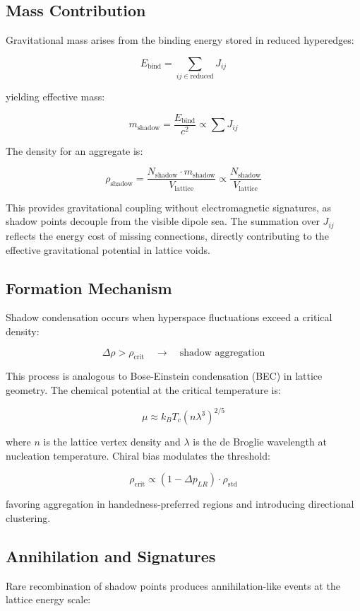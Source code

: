 \documentclass[11pt]{article}
\begin{document}
\subsection{Mass Contribution}
Gravitational mass arises from the binding energy stored in reduced hyperedges:

\[
E_{\text{bind}} = \sum_{ij \in \text{reduced}} J_{ij}
\]

yielding effective mass:

\[
m_{\text{shadow}} = \frac{E_{\text{bind}}}{c^2} \propto \sum J_{ij}
\]

The density for an aggregate is:

\[
\rho_{\text{shadow}} = \frac{N_{\text{shadow}} \cdot m_{\text{shadow}}}{V_{\text{lattice}}} \propto \frac{N_{\text{shadow}}}{V_{\text{lattice}}}
\]

This provides gravitational coupling without electromagnetic signatures, as shadow points decouple from the visible dipole sea. The summation over $J_{ij}$ reflects the energy cost of missing connections, directly contributing to the effective gravitational potential in lattice voids.

\subsection{Formation Mechanism}
Shadow condensation occurs when hyperspace fluctuations exceed a critical density:

\[
\Delta \rho > \rho_{\text{crit}} \quad \rightarrow \quad \text{shadow aggregation}
\]

This process is analogous to Bose-Einstein condensation (BEC) in lattice geometry. The chemical potential at the critical temperature is:

\[
\mu \approx k_B T_c (n \lambda^3)^{2/5}
\]

where $n$ is the lattice vertex density and $\lambda$ is the de Broglie wavelength at nucleation temperature. Chiral bias modulates the threshold:

\[
\rho_{\text{crit}} \propto (1 - \Delta p_{LR}) \cdot \rho_{\text{std}}
\]

favoring aggregation in handedness-preferred regions and introducing directional clustering.

\subsection{Annihilation and Signatures}
Rare recombination of shadow points produces annihilation-like events at the lattice energy scale:
\end{document}
